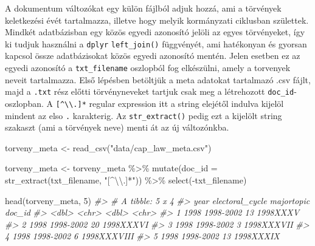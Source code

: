 \documentclass[
]{book}
\newenvironment{Shaded}{\begin{snugshade}}{\end{snugshade}}
\newcommand{\AttributeTok}[1]{\textcolor[rgb]{0.77,0.63,0.00}{#1}}
\newcommand{\CommentTok}[1]{\textcolor[rgb]{0.56,0.35,0.01}{\textit{#1}}}
\newcommand{\DecValTok}[1]{\textcolor[rgb]{0.00,0.00,0.81}{#1}}
\newcommand{\FunctionTok}[1]{\textcolor[rgb]{0.00,0.00,0.00}{#1}}
\newcommand{\NormalTok}[1]{#1}
\newcommand{\OtherTok}[1]{\textcolor[rgb]{0.56,0.35,0.01}{#1}}
\newcommand{\SpecialCharTok}[1]{\textcolor[rgb]{0.00,0.00,0.00}{#1}}
\newcommand{\StringTok}[1]{\textcolor[rgb]{0.31,0.60,0.02}{#1}}
\begin{document}
A dokumentum változókat egy külön fájlból adjuk hozzá, ami a törvények
keletkezési évét tartalmazza, illetve hogy melyik kormányzati ciklusban
születtek. Mindkét adatbázisban egy közös egyedi azonosító jelöli az
egyes törvényeket, így ki tudjuk használni a \texttt{dplyr}
\texttt{left\_join()} függvényét, ami hatékonyan és gyorsan kapcsol
össze adatbázisokat közös egyedi azonosító mentén. Jelen esetben ez az
egyedi azonosító a \texttt{txt\_filename} oszlopból fog elkészülni,
amely a torvenyek neveit tartalmazza. Első lépésben betöltjük a meta
adatokat tartalmazó .csv fájlt, majd a \texttt{.txt} rész előtti
törvényneveket tartjuk csak meg a létrehozott \texttt{doc\_id}-
oszlopban. A \texttt{{[}\^{}\textbackslash{}\textbackslash{}.{]}*}
regular expression itt a string elejétől indulva kijelöl mindent az elso
\texttt{.} karakterig. Az \texttt{str\_extract()} pedig ezt a kijelölt
string szakaszt (ami a törvények neve) menti át az új változónkba.

\begin{Shaded}
\begin{Highlighting}[]
\NormalTok{torveny\_meta }\OtherTok{\textless{}{-}} \FunctionTok{read\_csv}\NormalTok{(}\StringTok{"data/cap\_law\_meta.csv"}\NormalTok{)}

\NormalTok{torveny\_meta }\OtherTok{\textless{}{-}}\NormalTok{ torveny\_meta }\SpecialCharTok{\%\textgreater{}\%}
  \FunctionTok{mutate}\NormalTok{(}\AttributeTok{doc\_id =} \FunctionTok{str\_extract}\NormalTok{(txt\_filename, }\StringTok{"[\^{}}\SpecialCharTok{\textbackslash{}\textbackslash{}}\StringTok{.]*"}\NormalTok{)) }\SpecialCharTok{\%\textgreater{}\%}
  \FunctionTok{select}\NormalTok{(}\SpecialCharTok{{-}}\NormalTok{txt\_filename)}

\FunctionTok{head}\NormalTok{(torveny\_meta, }\DecValTok{5}\NormalTok{)}
\CommentTok{\#\textgreater{} \# A tibble: 5 x 4}
\CommentTok{\#\textgreater{}    year electoral\_cycle majortopic doc\_id     }
\CommentTok{\#\textgreater{}   \textless{}dbl\textgreater{} \textless{}chr\textgreater{}                \textless{}dbl\textgreater{} \textless{}chr\textgreater{}      }
\CommentTok{\#\textgreater{} 1  1998 1998{-}2002               13 1998XXXV   }
\CommentTok{\#\textgreater{} 2  1998 1998{-}2002               20 1998XXXVI  }
\CommentTok{\#\textgreater{} 3  1998 1998{-}2002                3 1998XXXVII }
\CommentTok{\#\textgreater{} 4  1998 1998{-}2002                6 1998XXXVIII}
\CommentTok{\#\textgreater{} 5  1998 1998{-}2002               13 1998XXXIX}
\end{Highlighting}
\end{Shaded}
\end{document}
